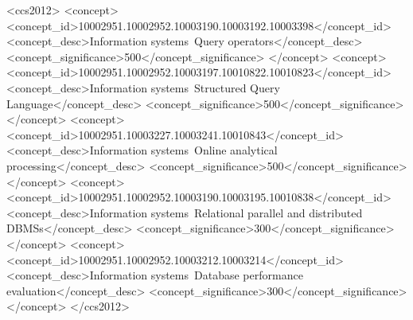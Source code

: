 \documentclass[sigconf,natbib=false,screen]{acmart}
\begin{document}
%
%
\begin{CCSXML}
<ccs2012>
<concept>
<concept_id>10002951.10002952.10003190.10003192.10003398</concept_id>
<concept_desc>Information systems~Query operators</concept_desc>
<concept_significance>500</concept_significance>
</concept>
<concept>
<concept_id>10002951.10002952.10003197.10010822.10010823</concept_id>
<concept_desc>Information systems~Structured Query Language</concept_desc>
<concept_significance>500</concept_significance>
</concept>
<concept>
<concept_id>10002951.10003227.10003241.10010843</concept_id>
<concept_desc>Information systems~Online analytical processing</concept_desc>
<concept_significance>500</concept_significance>
</concept>
<concept>
<concept_id>10002951.10002952.10003190.10003195.10010838</concept_id>
<concept_desc>Information systems~Relational parallel and distributed DBMSs</concept_desc>
<concept_significance>300</concept_significance>
</concept>
<concept>
<concept_id>10002951.10002952.10003212.10003214</concept_id>
<concept_desc>Information systems~Database performance evaluation</concept_desc>
<concept_significance>300</concept_significance>
</concept>
</ccs2012>
\end{CCSXML}





\maketitle








\balance
\printbibliography
\end{document}
